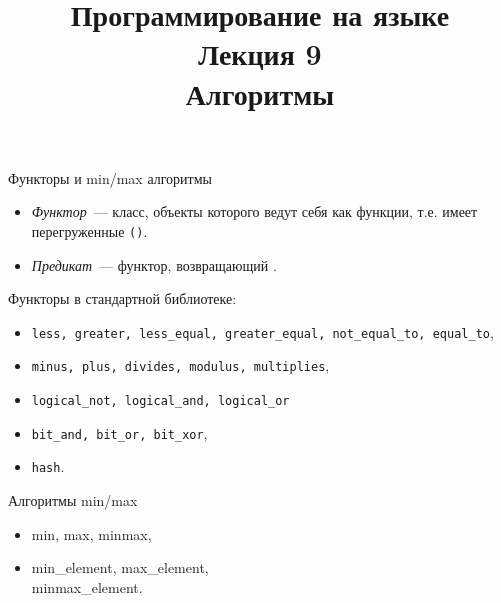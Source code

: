 \documentclass[aspectration=1610,t]{beamer}
\title{{\bf Программирование на языке \langcpp\protect\\Лекция
9\protect\vspace{1em}\\}Алгоритмы}
\begin{document}
\begin{frame} 
  \titlepage
\end{frame}

\begin{frame}[fragile]{Функторы и min/max алгоритмы}
\begin{itemize}
    \item \emph{Функтор}~--- класс, объекты которого ведут себя как функции,
            т.е. имеет перегруженные \texttt{()}.
    \item\emph{Предикат}~--- функтор, возвращающий .
\end{itemize}
\pause
Функторы в стандартной библиотеке:
\begin{itemize}
    \item {\tt less, greater, less\_equal, greater\_equal, not\_equal\_to, equal\_to},
    \item {\tt minus, plus, divides, modulus, multiplies},
    \item {\tt logical\_not, logical\_and, logical\_or}
    \item {\tt bit\_and, bit\_or, bit\_xor},
    \item {\tt hash}.
\end{itemize}
\pause
\begin{block}{Алгоритмы min/max}
    \begin{itemize}\tt
    \item min, max, minmax,
    \item min\_element, max\_element,\\ minmax\_element.
    \end{itemize}
\end{block}

\end{frame}
\end{document}
